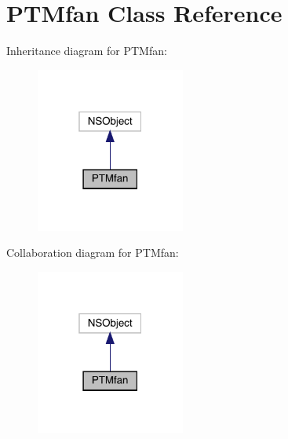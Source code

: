 \hypertarget{interface_p_t_mfan}{}\section{P\+T\+Mfan Class Reference}
\label{interface_p_t_mfan}


Inheritance diagram for P\+T\+Mfan\+:\nopagebreak
\begin{figure}[H]
\begin{center}
\leavevmode
\includegraphics[width=139pt]{interface_p_t_mfan__inherit__graph}
\end{center}
\end{figure}


Collaboration diagram for P\+T\+Mfan\+:\nopagebreak
\begin{figure}[H]
\begin{center}
\leavevmode
\includegraphics[width=139pt]{interface_p_t_mfan__coll__graph}
\end{center}
\end{figure}
